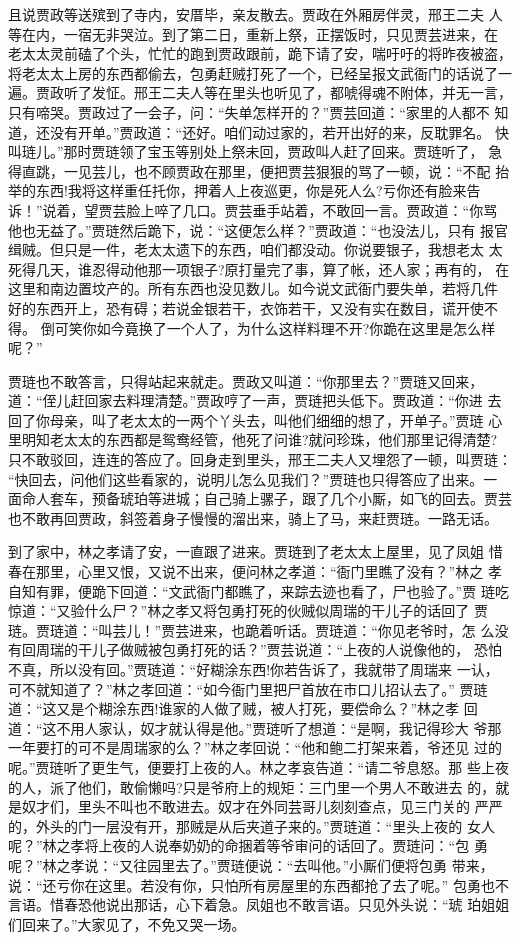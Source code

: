 且说贾政等送殡到了寺内，安厝毕，亲友散去。贾政在外厢房伴灵，邢王二夫
人等在内，一宿无非哭泣。到了第二日，重新上祭，正摆饭时，只见贾芸进来，在
老太太灵前磕了个头，忙忙的跑到贾政跟前，跪下请了安，喘吁吁的将昨夜被盗，
将老太太上房的东西都偷去，包勇赶贼打死了一个，已经呈报文武衙门的话说了一
遍。贾政听了发怔。邢王二夫人等在里头也听见了，都唬得魂不附体，并无一言，
只有啼哭。贾政过了一会子，问：“失单怎样开的？”贾芸回道：“家里的人都不
知道，还没有开单。”贾政道：“还好。咱们动过家的，若开出好的来，反耽罪名。
快叫琏儿。”那时贾琏领了宝玉等别处上祭未回，贾政叫人赶了回来。贾琏听了，
急得直跳，一见芸儿，也不顾贾政在那里，便把贾芸狠狠的骂了一顿，说：“不配
抬举的东西!我将这样重任托你，押着人上夜巡更，你是死人么?亏你还有脸来告
诉！”说着，望贾芸脸上啐了几口。贾芸垂手站着，不敢回一言。贾政道：“你骂
他也无益了。”贾琏然后跪下，说：“这便怎么样？”贾政道：“也没法儿，只有
报官缉贼。但只是一件，老太太遗下的东西，咱们都没动。你说要银子，我想老太
太死得几天，谁忍得动他那一项银子?原打量完了事，算了帐，还人家；再有的，
在这里和南边置坟产的。所有东西也没见数儿。如今说文武衙门要失单，若将几件
好的东西开上，恐有碍；若说金银若干，衣饰若干，又没有实在数目，谎开使不得。
倒可笑你如今竟换了一个人了，为什么这样料理不开?你跪在这里是怎么样呢？”

贾琏也不敢答言，只得站起来就走。贾政又叫道：“你那里去？”贾琏又回来，
道：“侄儿赶回家去料理清楚。”贾政哼了一声，贾琏把头低下。贾政道：“你进
去回了你母亲，叫了老太太的一两个丫头去，叫他们细细的想了，开单子。”贾琏
心里明知老太太的东西都是鸳鸯经管，他死了问谁?就问珍珠，他们那里记得清楚?
只不敢驳回，连连的答应了。回身走到里头，邢王二夫人又埋怨了一顿，叫贾琏：
“快回去，问他们这些看家的，说明儿怎么见我们？”贾琏也只得答应了出来。一
面命人套车，预备琥珀等进城；自己骑上骡子，跟了几个小厮，如飞的回去。贾芸
也不敢再回贾政，斜签着身子慢慢的溜出来，骑上了马，来赶贾琏。一路无话。

到了家中，林之孝请了安，一直跟了进来。贾琏到了老太太上屋里，见了凤姐
惜春在那里，心里又恨，又说不出来，便问林之孝道：“衙门里瞧了没有？”林之
孝自知有罪，便跪下回道：“文武衙门都瞧了，来踪去迹也看了，尸也验了。”贾
琏吃惊道：“又验什么尸？”林之孝又将包勇打死的伙贼似周瑞的干儿子的话回了
贾琏。贾琏道：“叫芸儿！”贾芸进来，也跪着听话。贾琏道：“你见老爷时，怎
么没有回周瑞的干儿子做贼被包勇打死的话？”贾芸说道：“上夜的人说像他的，
恐怕不真，所以没有回。”贾琏道：“好糊涂东西!你若告诉了，我就带了周瑞来
一认，可不就知道了？”林之孝回道：“如今衙门里把尸首放在市口儿招认去了。”
贾琏道：“这又是个糊涂东西!谁家的人做了贼，被人打死，要偿命么？”林之孝
回道：“这不用人家认，奴才就认得是他。”贾琏听了想道：“是啊，我记得珍大
爷那一年要打的可不是周瑞家的么？”林之孝回说：“他和鲍二打架来着，爷还见
过的呢。”贾琏听了更生气，便要打上夜的人。林之孝哀告道：“请二爷息怒。那
些上夜的人，派了他们，敢偷懒吗?只是爷府上的规矩：三门里一个男人不敢进去
的，就是奴才们，里头不叫也不敢进去。奴才在外同芸哥儿刻刻查点，见三门关的
严严的，外头的门一层没有开，那贼是从后夹道子来的。”贾琏道：“里头上夜的
女人呢？”林之孝将上夜的人说奉奶奶的命捆着等爷审问的话回了。贾琏问：“包
勇呢？”林之孝说：“又往园里去了。”贾琏便说：“去叫他。”小厮们便将包勇
带来，说：“还亏你在这里。若没有你，只怕所有房屋里的东西都抢了去了呢。”
包勇也不言语。惜春恐他说出那话，心下着急。凤姐也不敢言语。只见外头说：“琥
珀姐姐们回来了。”大家见了，不免又哭一场。

